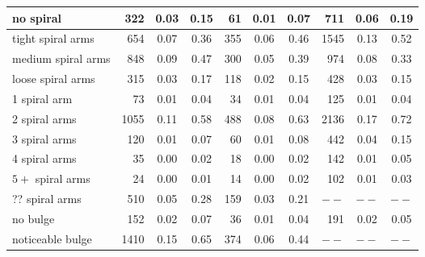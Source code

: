 \documentclass[iop,apj,tighten]{emulateapj}
\begin{document}
\begin{table*}
\begin{tabular}{l|rcc|rcc|rcc}
    no spiral               &    322 & 0.03 & 0.15 &     61 & 0.01 & 0.07       &    711 & 0.06 & 0.19                                                    \\
    \hline                                                                                                                                         
    tight spiral arms       &    654 & 0.07 & 0.36 &    355 & 0.06 & 0.46       &   1545 & 0.13 & 0.52                                                    \\
    medium spiral arms      &    848 & 0.09 & 0.47 &    300 & 0.05 & 0.39       &    974 & 0.08 & 0.33                                                    \\
    loose spiral arms       &    315 & 0.03 & 0.17 &    118 & 0.02 & 0.15       &    428 & 0.03 & 0.15                                                    \\
    \hline                                                                                                                                         
    1 spiral arm            &     73 & 0.01 & 0.04 &     34 & 0.01 & 0.04       &    125 & 0.01 & 0.04                                                    \\
    2 spiral arms           &   1055 & 0.11 & 0.58 &    488 & 0.08 & 0.63       &   2136 & 0.17 & 0.72                                                    \\
    3 spiral arms           &    120 & 0.01 & 0.07 &     60 & 0.01 & 0.08       &    442 & 0.04 & 0.15                                                    \\
    4 spiral arms           &     35 & 0.00 & 0.02 &     18 & 0.00 & 0.02       &    142 & 0.01 & 0.05                                                    \\
    $5+$ spiral arms        &     24 & 0.00 & 0.01 &     14 & 0.00 & 0.02       &    102 & 0.01 & 0.03                                                    \\
    ?? spiral arms          &    510 & 0.05 & 0.28 &    159 & 0.03 & 0.21       &   $--$ & $--$ & $--$                                                    \\
    \hline                                                                                                                  
    no bulge                &    152 & 0.02 & 0.07 &     36 & 0.01 & 0.04       &    191 & 0.02 & 0.05                                                   \\
    noticeable bulge        &   1410 & 0.15 & 0.65 &    374 & 0.06 & 0.44       &   $--$ & $--$ & $--$                                                   \\

\end{tabular}
\end{table*}
\end{document}
